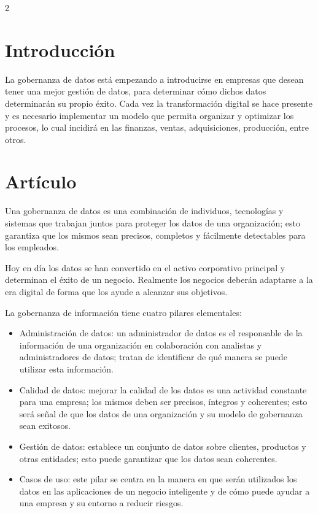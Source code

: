 \documentclass[12pt,spanish,Letterpaper,openany]{book}
\begin{document}
\begin {multicols}{2}
{\section{Introducción}\label{introducciuxf3n-2}}

La gobernanza de datos está empezando a introducirse en empresas que desean tener una mejor gestión de datos, para determinar cómo dichos datos determinarán su propio éxito. Cada vez la transformación digital se hace presente y es necesario implementar un modelo que permita organizar y optimizar los procesos, lo cual incidirá en las finanzas, ventas, adquisiciones, producción, entre otros.

\hypertarget{artuxedculo-2}{%
\section{Artículo}\label{artuxedculo-2}}

Una gobernanza de datos es una combinación de individuos, tecnologías y sistemas que trabajan juntos para proteger los datos de una organización; esto garantiza que los mismos sean precisos, completos y fácilmente detectables para los empleados.

Hoy en día los datos se han convertido en el activo corporativo principal y determinan el éxito de un negocio. Realmente los negocios deberán adaptarse a la era digital de forma que los ayude a alcanzar sus objetivos.

La gobernanza de información tiene cuatro pilares elementales:

\begin{itemize}
\item
  Administración de datos: un administrador de datos es el responsable de la información de una organización en colaboración con analistas y administradores de datos; tratan de identificar de qué manera se puede utilizar esta información.
\item
  Calidad de datos: mejorar la calidad de los datos es una actividad constante para una empresa; los mismos deben ser precisos, íntegros y coherentes; esto será señal de que los datos de una organización y su modelo de gobernanza sean exitosos.
\item
  Gestión de datos: establece un conjunto de datos sobre clientes, productos y otras entidades; esto puede garantizar que los datos sean coherentes.
\item
  Casos de uso: este pilar se centra en la manera en que serán utilizados los datos en las aplicaciones de un negocio inteligente y de cómo puede ayudar a una empresa y su entorno a reducir riesgos.
\end{itemize}


\end{multicols}
\end{document}
